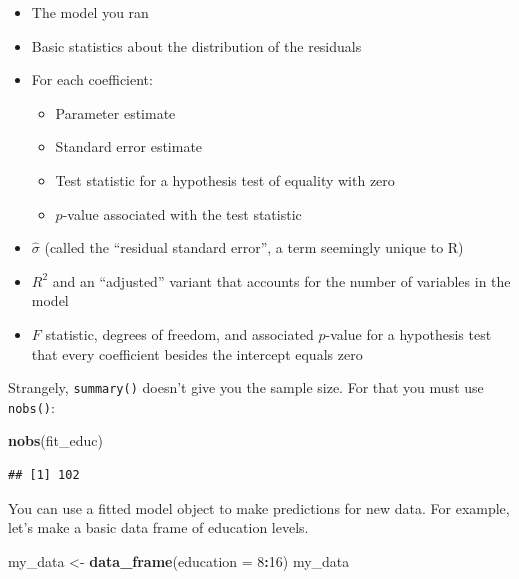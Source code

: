 \documentclass[
  12pt,
  oneside,openany]{book}
\newenvironment{Shaded}{\begin{snugshade}}{\end{snugshade}}
\newcommand{\DataTypeTok}[1]{\textcolor[rgb]{0.13,0.29,0.53}{#1}}
\newcommand{\DecValTok}[1]{\textcolor[rgb]{0.00,0.00,0.81}{#1}}
\newcommand{\KeywordTok}[1]{\textcolor[rgb]{0.13,0.29,0.53}{\textbf{#1}}}
\newcommand{\NormalTok}[1]{#1}
\newcommand{\OperatorTok}[1]{\textcolor[rgb]{0.81,0.36,0.00}{\textbf{#1}}}
\newcommand{\StringTok}[1]{\textcolor[rgb]{0.31,0.60,0.02}{#1}}
\providecommand{\tightlist}{%
  \setlength{\itemsep}{0pt}\setlength{\parskip}{0pt}}
\begin{document}
\begin{itemize}
\tightlist
\item
  The model you ran
\item
  Basic statistics about the distribution of the residuals
\item
  For each coefficient:

  \begin{itemize}
  \tightlist
  \item
    Parameter estimate
  \item
    Standard error estimate
  \item
    Test statistic for a hypothesis test of equality with zero
  \item
    \(p\)-value associated with the test statistic
  \end{itemize}
\item
  \(\hat{\sigma}\) (called the ``residual standard error'', a term seemingly unique to R)
\item
  \(R^2\) and an ``adjusted'' variant that accounts for the number of variables in the model
\item
  \(F\) statistic, degrees of freedom, and associated \(p\)-value for a hypothesis test that every coefficient besides the intercept equals zero
\end{itemize}

Strangely, \texttt{summary()} doesn't give you the sample size. For that you must use \texttt{nobs()}:

\begin{Shaded}
\begin{Highlighting}[]
\KeywordTok{nobs}\NormalTok{(fit\_educ)}
\end{Highlighting}
\end{Shaded}

\begin{verbatim}
## [1] 102
\end{verbatim}

You can use a fitted model object to make predictions for new data. For example, let's make a basic data frame of education levels.

\begin{Shaded}
\begin{Highlighting}[]
\NormalTok{my\_data <{-}}\StringTok{ }\KeywordTok{data\_frame}\NormalTok{(}\DataTypeTok{education =} \DecValTok{8}\OperatorTok{:}\DecValTok{16}\NormalTok{)}
\NormalTok{my\_data}
\end{Highlighting}
\end{Shaded}
\end{document}
